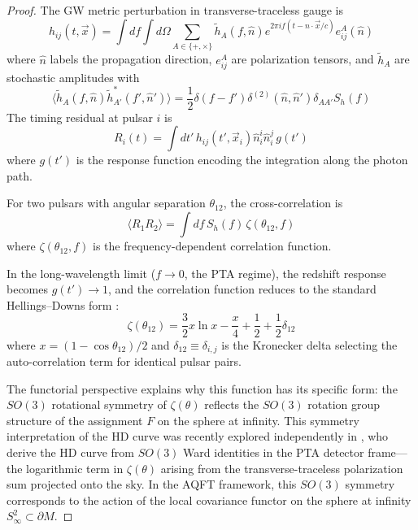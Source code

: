 \documentclass[11pt,a4paper]{article}
\begin{document}
\begin{proof}
The GW metric perturbation in transverse-traceless gauge is
\begin{equation}
h_{ij}(t, \vec{x}) = \int df \int d\Omega \sum_{A \in \{+,\times\}} \tilde{h}_A(f, \hat{n}) e^{2\pi i f (t - \hat{n}\cdot\vec{x}/c)} e_{ij}^A(\hat{n})
\end{equation}
where $\hat{n}$ labels the propagation direction, $e_{ij}^A$ are polarization tensors, and $\tilde{h}_A$ are stochastic amplitudes with
\begin{equation}
\langle \tilde{h}_A(f, \hat{n}) \tilde{h}_{A'}^*(f', \hat{n}') \rangle = \frac{1}{2} \delta(f-f') \delta^{(2)}(\hat{n}, \hat{n}') \delta_{AA'} S_h(f)
\end{equation}
The timing residual at pulsar $i$ is
\begin{equation}
R_i(t) = \int dt' \, h_{ij}(t', \vec{x}_i) \hat{n}_i^i \hat{n}_i^j \, g(t')
\end{equation}
where $g(t')$ is the response function encoding the integration along the photon path.

For two pulsars with angular separation $\theta_{12}$, the cross-correlation is
\begin{equation}
\langle R_1 R_2 \rangle = \int df \, S_h(f) \, \zeta(\theta_{12}, f)
\end{equation}
where $\zeta(\theta_{12}, f)$ is the frequency-dependent correlation function.

In the long-wavelength limit ($f \to 0$, the PTA regime), the redshift response becomes $g(t') \to 1$, and the correlation function reduces to the standard Hellings--Downs form \cite{Hellings:1983}:
\begin{equation}
\zeta(\theta_{12}) = \frac{3}{2} x \ln x - \frac{x}{4} + \frac{1}{2} + \frac{1}{2}\delta_{12}
\end{equation}
where $x = (1-\cos\theta_{12})/2$ and $\delta_{12} \equiv \delta_{i,j}$ is the Kronecker delta selecting the auto-correlation term for identical pulsar pairs.

The functorial perspective explains why this function has its specific form: the $SO(3)$ rotational symmetry of $\zeta(\theta)$ reflects the $SO(3)$ rotation group structure of the assignment $F$ on the sphere at infinity. This symmetry interpretation of the HD curve was recently explored independently in \cite{Kehagias:2024}, who derive the HD curve from $SO(3)$ Ward identities in the PTA detector frame---the logarithmic term in $\zeta(\theta)$ arising from the transverse-traceless polarization sum projected onto the sky. In the AQFT framework, this $SO(3)$ symmetry corresponds to the action of the local covariance functor on the sphere at infinity $S^2_\infty \subset \partial M$.


\end{proof}
\end{document}
